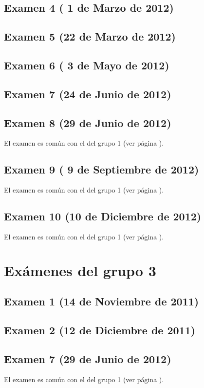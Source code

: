 \documentclass[a4paper,12pt,twoside]{book}
\begin{document}
\section{Examen 4 ( 1 de Marzo de 2012)}
\section{Examen 5 (22 de Marzo de 2012)}
\section{Examen 6 ( 3 de Mayo de 2012)}
\section{Examen 7 (24 de Junio de 2012)}
\section{Examen 8 (29 de Junio de 2012)} 
El examen es común con el del grupo 1 (ver página \pageref{examen_11_12_1_8}).
\section{Examen 9 ( 9 de Septiembre de 2012)} 
El examen es común con el del grupo 1 (ver página \pageref{examen_11_12_1_9}).
\section{Examen 10 (10 de Diciembre de 2012)} 
El examen es común con el del grupo 1 (ver página \pageref{examen_11_12_1_10}).

\chapter{Exámenes del grupo 3}
\section{Examen 1 (14 de Noviembre de 2011)}
\section{Examen 2 (12 de Diciembre de 2011)}
\section{Examen 7 (29 de Junio de 2012)} 
El examen es común con el del grupo 1 (ver página \pageref{examen_11_12_1_8}).
\end{document}
